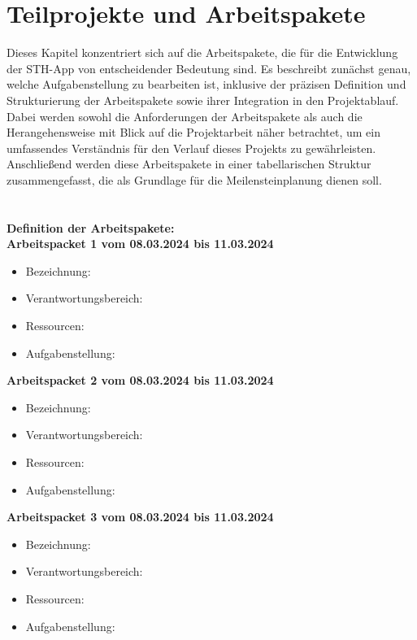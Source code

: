 \chapter{Teilprojekte und Arbeitspakete}
Dieses Kapitel konzentriert sich auf die Arbeitspakete, die für die Entwicklung der STH-App von entscheidender Bedeutung sind.
Es beschreibt zunächst genau, welche Aufgabenstellung zu bearbeiten ist, inklusive der präzisen Definition und Strukturierung der Arbeitspakete sowie ihrer Integration in den Projektablauf. 
Dabei werden sowohl die Anforderungen der Arbeitspakete als auch die Herangehensweise mit Blick auf die Projektarbeit näher betrachtet, um ein umfassendes Verständnis für den Verlauf dieses Projekts zu gewährleisten.
Anschließend werden diese Arbeitspakete in einer tabellarischen Struktur zusammengefasst, die als Grundlage für die Meilensteinplanung dienen soll.
\\
\\
\\
\textbf{Definition der Arbeitspakete:} \\

\textbf{Arbeitspacket 1 vom 08.03.2024 bis 11.03.2024}
\begin{itemize}[itemsep=0pt]
	\item{Bezeichnung: }
	\item{Verantwortungsbereich: } 
	\item{Ressourcen: } 
    \item{Aufgabenstellung: }
\end{itemize} 

\textbf{Arbeitspacket 2 vom 08.03.2024 bis 11.03.2024}
\begin{itemize}[itemsep=0pt]
	\item{Bezeichnung: }
	\item{Verantwortungsbereich: } 
	\item{Ressourcen: } 
    \item{Aufgabenstellung: }
\end{itemize}

\textbf{Arbeitspacket 3 vom 08.03.2024 bis 11.03.2024}
\begin{itemize}[itemsep=0pt]
	\item{Bezeichnung: }
	\item{Verantwortungsbereich: } 
	\item{Ressourcen: } 
    \item{Aufgabenstellung: }
\end{itemize}

